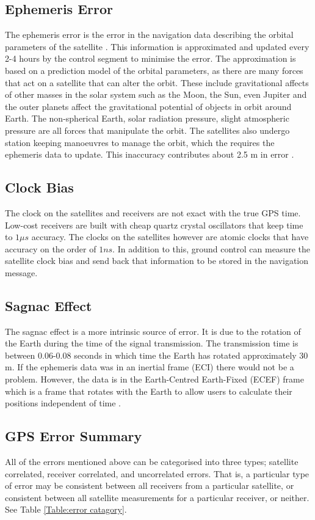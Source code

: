 \subsection{Ephemeris Error}
The ephemeris error is the error in the navigation data describing the orbital parameters of the satellite \cite{Kaplan_ephemeriserror}. This information is approximated and updated every 2-4 hours by the control segment to minimise the error. The approximation is based on a prediction model of the orbital parameters, as there are many forces that act on a satellite that can alter the orbit. These include gravitational affects of other masses in the solar system such as the Moon, the Sun, even Jupiter and the outer planets affect the gravitational potential of objects in orbit around Earth. The non-spherical Earth, solar radiation pressure, slight atmospheric pressure are all forces that manipulate the orbit. The satellites also undergo station keeping manoeuvres to manage the orbit, which the requires the ephemeris data to update. This inaccuracy contributes about 2.5 m in error \cite{trimble_errors}.

\subsection{Clock Bias}
The clock on the satellites and receivers are not exact with the true GPS time. Low-cost receivers are built with cheap quartz crystal oscillators that keep time to $1\mu s$ accuracy. The clocks on the satellites however are atomic clocks that have accuracy on the order of $1 ns$. In addition to this, ground control can measure the satellite clock bias and send back that information to be stored in the navigation message. \cite{zinas_2015}

\subsection{Sagnac Effect}
The sagnac effect is a more intrinsic source of error. It is due to the rotation of the Earth during the time of the signal transmission. The transmission time is between 0.06-0.08 seconds in which time the Earth has rotated approximately 30 m. If the ephemeris data was in an inertial frame (ECI) there would not be a problem. However, the data is in the Earth-Centred Earth-Fixed (ECEF) frame which is a frame that rotates with the Earth to allow users to calculate their positions independent of time \cite{HighAccDiffTrack}.

\subsection{GPS Error Summary}
All of the errors mentioned above can be categorised into three types; satellite correlated, receiver correlated, and uncorrelated errors. That is, a particular type of error may be consistent between all receivers from a particular satellite, or consistent between all satellite measurements for a particular receiver, or neither. See Table \ref{Table:error catagory}.


